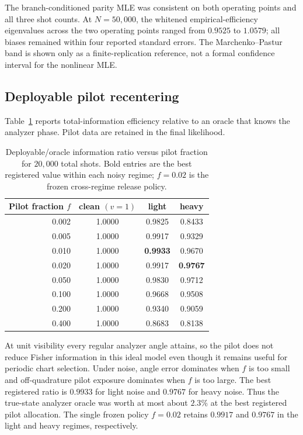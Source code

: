 \documentclass[11pt]{article}
\theoremstyle{definition}
\theoremstyle{remark}
\begin{document}
The branch-conditioned parity MLE was consistent on both operating points and all three shot counts. At $N=50{,}000$, the whitened empirical-efficiency eigenvalues across the two operating points ranged from $0.9525$ to $1.0579$; all biases remained within four reported standard errors. The Marchenko--Pastur band is shown only as a finite-replication reference, not a formal confidence interval for the nonlinear MLE.

\subsection{Deployable pilot recentering}
\label{sec:results-n7}
Table~\ref{tab:pilot} reports total-information efficiency relative to an oracle that knows the analyzer phase. Pilot data are retained in the final likelihood.

\begin{table}[H]
\centering
\caption{Deployable/oracle information ratio versus pilot fraction for $20{,}000$ total shots. Bold entries are the best registered value within each noisy regime; $f=0.02$ is the frozen cross-regime release policy.}
\label{tab:pilot}
\begin{tabular}{rccc}
\toprule
Pilot fraction $f$ & clean $(v=1)$ & light & heavy\\
\midrule
0.002 & 1.0000 & 0.9825 & 0.8433\\
0.005 & 1.0000 & 0.9917 & 0.9329\\
0.010 & 1.0000 & \textbf{0.9933} & 0.9670\\
0.020 & 1.0000 & 0.9917 & \textbf{0.9767}\\
0.050 & 1.0000 & 0.9830 & 0.9712\\
0.100 & 1.0000 & 0.9668 & 0.9508\\
0.200 & 1.0000 & 0.9340 & 0.9059\\
0.400 & 1.0000 & 0.8683 & 0.8138\\
\bottomrule
\end{tabular}
\end{table}

At unit visibility every regular analyzer angle attains, so the pilot does not reduce Fisher information in this ideal model even though it remains useful for periodic chart selection. Under noise, angle error dominates when $f$ is too small and off-quadrature pilot exposure dominates when $f$ is too large. The best registered ratio is $0.9933$ for light noise and $0.9767$ for heavy noise. Thus the true-state analyzer oracle was worth at most about $2.3\%$ at the best registered pilot allocation. The single frozen policy $f=0.02$ retains $0.9917$ and $0.9767$ in the light and heavy regimes, respectively.
\end{document}
